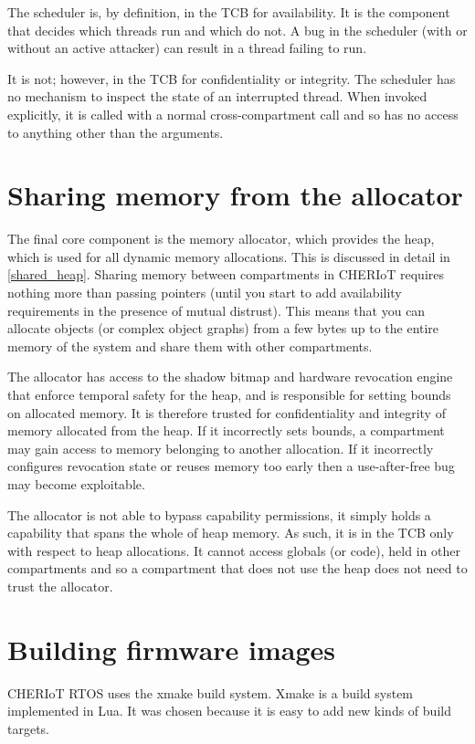 The scheduler is, by definition, in the TCB for availability.
It is the component that decides which threads run and which do not.
A bug in the scheduler (with or without an active attacker) can result in a thread failing to run.

It is not; however, in the TCB for confidentiality or integrity.
The scheduler has no mechanism to inspect the state of an interrupted thread.
When invoked explicitly, it is called with a normal cross-compartment call and so has no access to anything other than the arguments.

\section{Sharing memory from the allocator}

The final core component is the memory allocator, which provides the heap, which is used for all dynamic memory allocations.
This is discussed in detail in \ref{shared_heap}.
Sharing memory between compartments in CHERIoT requires nothing more than passing pointers (until you start to add availability requirements in the presence of mutual distrust).
This means that you can allocate objects (or complex object graphs) from a few bytes up to the entire memory of the system and share them with other compartments.

The allocator has access to the shadow bitmap and hardware revocation engine that enforce temporal safety for the heap, and is responsible for setting bounds on allocated memory.
It is therefore trusted for confidentiality and integrity of memory allocated from the heap.
If it incorrectly sets bounds, a compartment may gain access to memory belonging to another allocation.
If it incorrectly configures revocation state or reuses memory too early then a use-after-free bug may become exploitable.

The allocator is not able to bypass capability permissions, it simply holds a capability that spans the whole of heap memory.
As such, it is in the TCB only with respect to heap allocations.
It cannot access globals (or code), held in other compartments and so a compartment that does not use the heap does not need to trust the allocator.

\section{Building firmware images}

CHERIoT RTOS uses the xmake build system.
Xmake is a build system implemented in Lua.
It was chosen because it is easy to add new kinds of build targets.

